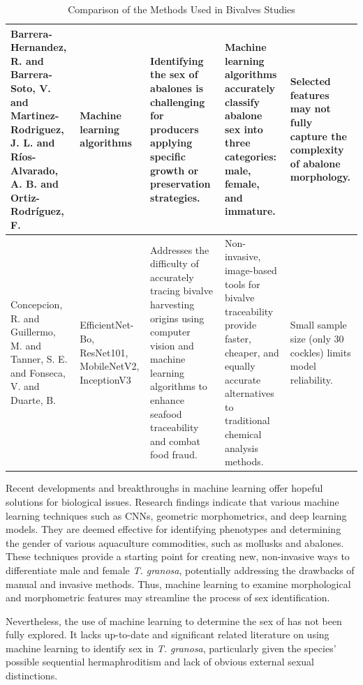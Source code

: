 \begin{table}[]
\begin{adjustbox}{scale=0.55,center}
\begin{tabular}{|p{5cm}|p{5cm}|p{8cm}|p{8cm}|p{8cm}|}
		Barrera-Hernandez, R. and Barrera-Soto, V. and Martinez-Rodriguez, J. L. and Ríos-Alvarado, A. B. and Ortiz-Rodríguez, F. &
		Machine learning algorithms &
		Identifying the sex of abalones is challenging for producers applying specific growth or preservation strategies. &
		Machine learning algorithms accurately classify abalone sex into three categories: male, female, and immature. &
		Selected features may not fully capture the complexity of abalone morphology. \\ \hline
		
		Concepcion, R. and Guillermo, M. and Tanner, S. E. and Fonseca, V. and Duarte, B. &
		EfficientNet-Bo, ResNet101, MobileNetV2, InceptionV3 &
		Addresses the difficulty of accurately tracing bivalve harvesting origins using computer vision and machine learning algorithms to enhance seafood traceability and combat food fraud. &
		Non-invasive, image-based tools for bivalve traceability provide faster, cheaper, and equally accurate alternatives to traditional chemical analysis methods. &
		Small sample size (only 30 cockles) limits model reliability. \\ \hline
		
	\end{tabular}
	
	\end{adjustbox}
	\caption{Comparison of the Methods Used in Bivalves Studies}
	\label{table:1}
\end{table}

\newpage

Recent developments and breakthroughs in machine learning offer hopeful solutions for biological issues. Research findings indicate that various machine learning techniques such as CNNs, geometric morphometrics, and deep learning models. They are deemed effective for identifying phenotypes and determining the gender of various aquaculture commodities, such as mollusks and abalones. These techniques provide a starting point for creating new, non-invasive ways to differentiate male and female \textit{T. granosa}, potentially addressing the drawbacks of manual and invasive methods. Thus, machine learning to examine morphological and morphometric features may streamline the process of sex identification.

Nevertheless, the use of machine learning to determine the sex of \Tgranosa has not been fully explored. It lacks up-to-date and significant related literature on using machine learning to identify sex in \textit{T. granosa}, particularly given the species’ possible sequential hermaphroditism and lack of obvious external sexual distinctions.










